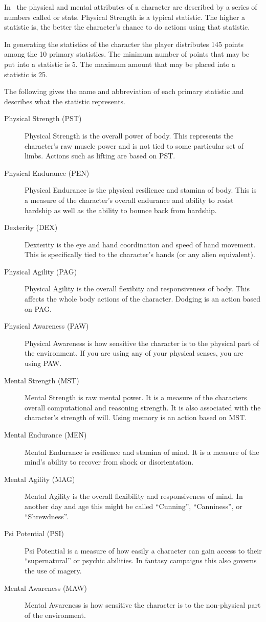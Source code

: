 In \SH\ the physical and mental attributes of a character
are described by a series of numbers called  or stats.
Physical Strength is a typical statistic. The higher a
statistic is, the better the character's chance to do actions using
that statistic.

In generating the statistics of the character the player distributes 
145 points among the 10 primary statistics. The minimum number of points that may be
put into a statistic is 5. The maximum amount that may be placed into
a statistic is 25.

The following gives the name and abbreviation of each primary statistic and
describes what the statistic represents.

\begin{description}
	\item[Physical Strength	(PST)]
	Physical Strength is the overall power of body. This represents
	the character's raw muscle power and is not tied to some particular
	set of limbs. Actions such as lifting are based on PST.
	\item[Physical Endurance (PEN)]
	Physical Endurance is the physical resilience and stamina of body.
	This is a measure of the character's overall endurance and ability
	to resist hardship as well as the ability to bounce back from hardship.
	\item[Dexterity	(DEX)]
	Dexterity is the eye and hand coordination and speed of hand movement.
	This is	specifically tied to the character's hands (or any alien 
	equivalent).
	\item[Physical Agility (PAG)]
	Physical Agility is the overall flexibity and responsiveness of body.
	This affects the whole body actions of the character. Dodging is 
	an action based on PAG.
	\item[Physical Awareness (PAW)]
	Physical Awareness is how sensitive the character is to
	the physical part of the environment. If you are using any of 
	your physical senses, you are using PAW.
	\item[Mental Strength (MST)]
	Mental Strength is raw mental power. It is a measure of the characters 
	overall computational and reasoning strength. It is also associated with
	the character's strength of will. Using memory is an action based 
	on MST.
	\item[Mental Endurance (MEN)]
	Mental Endurance is resilience and stamina of mind. It is a measure of the
	mind's ability to recover from shock or disorientation.
	\item[Mental Agility (MAG)]
	Mental Agility is the overall flexibility and responsiveness of mind.
	In another day and age this might be called ``Cunning'', 
	``Canniness'', or ``Shrewdness''.
	\item[Psi Potential (PSI)]
	Psi Potential is a measure of how easily a character can gain access to
	their ``supernatural'' or psychic abilities. In fantasy campaigns 
	this also governs the use of magery.
	\item[Mental Awareness (MAW)]
	Mental Awareness is how sensitive the character is to
	the non-physical part of the environment. 
\end{description}

